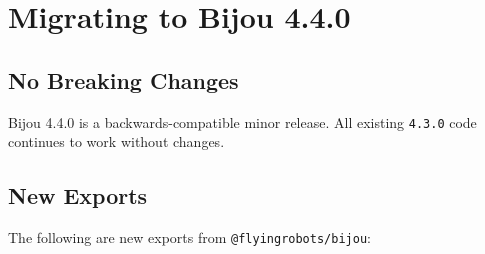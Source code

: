 \chapter{Migrating to Bijou 4.4.0}\label{record-267}

\smallskip

\section{No Breaking Changes}\label{record-267-no-breaking-changes}

Bijou 4.4.0 is a backwards-compatible minor release. All existing \texttt{4\allowbreak{}.\allowbreak{}3\allowbreak{}.\allowbreak{}0} code continues to work without changes.

\section{New Exports}\label{record-267-new-exports}

The following are new exports from \texttt{@\allowbreak{}f\allowbreak{}l\allowbreak{}y\allowbreak{}i\allowbreak{}n\allowbreak{}g\allowbreak{}r\allowbreak{}o\allowbreak{}b\allowbreak{}o\allowbreak{}t\allowbreak{}s\allowbreak{}/\allowbreak{}b\allowbreak{}i\allowbreak{}j\allowbreak{}o\allowbreak{}u}:

